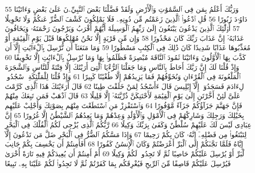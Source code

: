 {\tiny\colorbox{cl_aya}{55}} وَرَبُّكَ أَعْلَمُ بِمَن فِى ٱلسَّمَٰوَٰتِ وَٱلْأَرْضِ وَلَقَدْ فَضَّلْنَا بَعْضَ ٱلنَّبِيِّۦنَ عَلَىٰ بَعْضٍ وَءَاتَيْنَا دَاوُۥدَ زَبُورًا
{\tiny\colorbox{cl_aya}{56}} قُلِ ٱدْعُوا۟ ٱلَّذِينَ زَعَمْتُم مِّن دُونِهِۦ فَلَا يَمْلِكُونَ كَشْفَ ٱلضُّرِّ عَنكُمْ وَلَا تَحْوِيلًا
{\tiny\colorbox{cl_aya}{57}} أُو۟لَٰٓئِكَ ٱلَّذِينَ يَدْعُونَ يَبْتَغُونَ إِلَىٰ رَبِّهِمُ ٱلْوَسِيلَةَ أَيُّهُمْ أَقْرَبُ وَيَرْجُونَ رَحْمَتَهُۥ وَيَخَافُونَ عَذَابَهُۥٓ إِنَّ عَذَابَ رَبِّكَ كَانَ مَحْذُورًا
{\tiny\colorbox{cl_aya}{58}} وَإِن مِّن قَرْيَةٍ إِلَّا نَحْنُ مُهْلِكُوهَا قَبْلَ يَوْمِ ٱلْقِيَٰمَةِ أَوْ مُعَذِّبُوهَا عَذَابًا شَدِيدًا كَانَ ذَٰلِكَ فِى ٱلْكِتَٰبِ مَسْطُورًا
{\tiny\colorbox{cl_aya}{59}} وَمَا مَنَعَنَآ أَن نُّرْسِلَ بِٱلْءَايَٰتِ إِلَّآ أَن كَذَّبَ بِهَا ٱلْأَوَّلُونَ وَءَاتَيْنَا ثَمُودَ ٱلنَّاقَةَ مُبْصِرَةً فَظَلَمُوا۟ بِهَا وَمَا نُرْسِلُ بِٱلْءَايَٰتِ إِلَّا تَخْوِيفًا
{\tiny\colorbox{cl_aya}{60}} وَإِذْ قُلْنَا لَكَ إِنَّ رَبَّكَ أَحَاطَ بِٱلنَّاسِ وَمَا جَعَلْنَا ٱلرُّءْيَا ٱلَّتِىٓ أَرَيْنَٰكَ إِلَّا فِتْنَةً لِّلنَّاسِ وَٱلشَّجَرَةَ ٱلْمَلْعُونَةَ فِى ٱلْقُرْءَانِ وَنُخَوِّفُهُمْ فَمَا يَزِيدُهُمْ إِلَّا طُغْيَٰنًا كَبِيرًا
{\tiny\colorbox{cl_aya}{61}} وَإِذْ قُلْنَا لِلْمَلَٰٓئِكَةِ ٱسْجُدُوا۟ لِءَادَمَ فَسَجَدُوٓا۟ إِلَّآ إِبْلِيسَ قَالَ ءَأَسْجُدُ لِمَنْ خَلَقْتَ طِينًا
{\tiny\colorbox{cl_aya}{62}} قَالَ أَرَءَيْتَكَ هَٰذَا ٱلَّذِى كَرَّمْتَ عَلَىَّ لَئِنْ أَخَّرْتَنِ إِلَىٰ يَوْمِ ٱلْقِيَٰمَةِ لَأَحْتَنِكَنَّ ذُرِّيَّتَهُۥٓ إِلَّا قَلِيلًا
{\tiny\colorbox{cl_aya}{63}} قَالَ ٱذْهَبْ فَمَن تَبِعَكَ مِنْهُمْ فَإِنَّ جَهَنَّمَ جَزَآؤُكُمْ جَزَآءً مَّوْفُورًا
{\tiny\colorbox{cl_aya}{64}} وَٱسْتَفْزِزْ مَنِ ٱسْتَطَعْتَ مِنْهُم بِصَوْتِكَ وَأَجْلِبْ عَلَيْهِم بِخَيْلِكَ وَرَجِلِكَ وَشَارِكْهُمْ فِى ٱلْأَمْوَٰلِ وَٱلْأَوْلَٰدِ وَعِدْهُمْ وَمَا يَعِدُهُمُ ٱلشَّيْطَٰنُ إِلَّا غُرُورًا
{\tiny\colorbox{cl_aya}{65}} إِنَّ عِبَادِى لَيْسَ لَكَ عَلَيْهِمْ سُلْطَٰنٌ وَكَفَىٰ بِرَبِّكَ وَكِيلًا
{\tiny\colorbox{cl_aya}{66}} رَّبُّكُمُ ٱلَّذِى يُزْجِى لَكُمُ ٱلْفُلْكَ فِى ٱلْبَحْرِ لِتَبْتَغُوا۟ مِن فَضْلِهِۦٓ إِنَّهُۥ كَانَ بِكُمْ رَحِيمًا
{\tiny\colorbox{cl_aya}{67}} وَإِذَا مَسَّكُمُ ٱلضُّرُّ فِى ٱلْبَحْرِ ضَلَّ مَن تَدْعُونَ إِلَّآ إِيَّاهُ فَلَمَّا نَجَّىٰكُمْ إِلَى ٱلْبَرِّ أَعْرَضْتُمْ وَكَانَ ٱلْإِنسَٰنُ كَفُورًا
{\tiny\colorbox{cl_aya}{68}} أَفَأَمِنتُمْ أَن يَخْسِفَ بِكُمْ جَانِبَ ٱلْبَرِّ أَوْ يُرْسِلَ عَلَيْكُمْ حَاصِبًا ثُمَّ لَا تَجِدُوا۟ لَكُمْ وَكِيلًا
{\tiny\colorbox{cl_aya}{69}} أَمْ أَمِنتُمْ أَن يُعِيدَكُمْ فِيهِ تَارَةً أُخْرَىٰ فَيُرْسِلَ عَلَيْكُمْ قَاصِفًا مِّنَ ٱلرِّيحِ فَيُغْرِقَكُم بِمَا كَفَرْتُمْ ثُمَّ لَا تَجِدُوا۟ لَكُمْ عَلَيْنَا بِهِۦ تَبِيعًا
